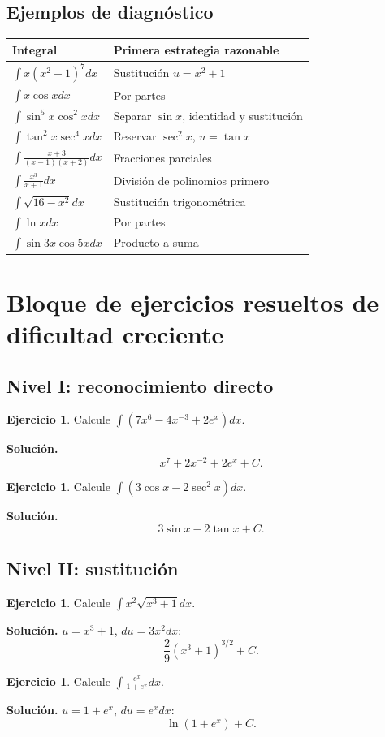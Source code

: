 \documentclass[12pt]{article}
\theoremstyle{definition}\newtheorem{definicion}[teorema]{Definición}\newtheorem{ejemplo}[teorema]{Ejemplo}\newtheorem{ejercicio}[teorema]{Ejercicio}
\theoremstyle{remark}\newtheorem*{observacion}{Observación}\newtheorem*{advertencia}{Advertencia}\newtheorem*{estrategia}{Estrategia}
\begin{document}
\subsection{Ejemplos de diagnóstico}
\begin{center}\begin{longtable}{p{}p{}}\toprule
Integral & Primera estrategia razonable\\\midrule
$\int x(x^2+1)^7dx$ & Sustitución $u=x^2+1$\\
$\int x\cos xdx$ & Por partes\\
$\int\sin^5x\cos^2xdx$ & Separar $\sin x$, identidad y sustitución\\
$\int\tan^2x\sec^4xdx$ & Reservar $\sec^2x$, $u=\tan x$\\
$\int\frac{x+3}{(x-1)(x+2)}dx$ & Fracciones parciales\\
$\int\frac{x^3}{x+1}dx$ & División de polinomios primero\\
$\int\sqrt{16-x^2}dx$ & Sustitución trigonométrica\\
$\int\ln xdx$ & Por partes\\
$\int\sin3x\cos5xdx$ & Producto-a-suma\\\bottomrule
\end{longtable}\end{center}

\section{Bloque de ejercicios resueltos de dificultad creciente}
\subsection{Nivel I: reconocimiento directo}
\begin{ejercicio}Calcule $\int(7x^6-4x^{-3}+2e^x)dx$.\end{ejercicio}
\textbf{Solución.}
\[\boxed{x^7+2x^{-2}+2e^x+C}.\]
\begin{ejercicio}Calcule $\int(3\cos x-2\sec^2x)dx$.\end{ejercicio}
\textbf{Solución.}
\[\boxed{3\sin x-2\tan x+C}.\]

\subsection{Nivel II: sustitución}
\begin{ejercicio}Calcule $\int x^2\sqrt{x^3+1}dx$.\end{ejercicio}
\textbf{Solución.} $u=x^3+1$, $du=3x^2dx$:
\[\boxed{\frac{2}{9}(x^3+1)^{3/2}+C}.\]
\begin{ejercicio}Calcule $\int\frac{e^x}{1+e^x}dx$.\end{ejercicio}
\textbf{Solución.} $u=1+e^x$, $du=e^xdx$:
\[\boxed{\ln(1+e^x)+C}.\]
\end{document}
